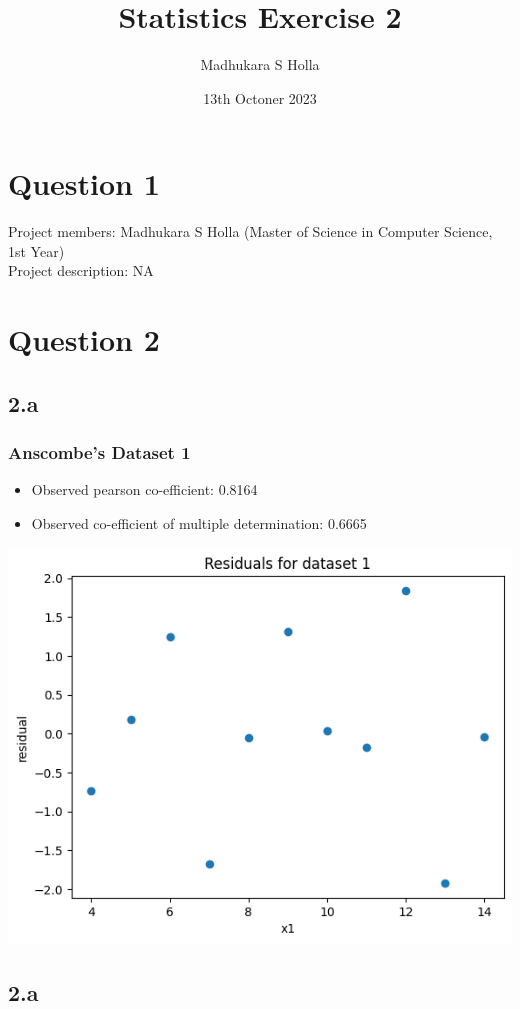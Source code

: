 \documentclass[12pt]{article}
\author{Madhukara S Holla}
\title{Statistics Exercise 2}
\date{13th Octoner 2023}
\begin{document}
\maketitle
\newpage
\section*{Question 1}
Project members: Madhukara S Holla (Master of Science in Computer Science, 1st Year)
\\
Project description: NA

\newpage
\section*{Question 2}
\subsection*{2.a}
\subsubsection*{Anscombe's Dataset 1}
\begin{itemize}
    \item Observed pearson co-efficient: 0.8164
    \item Observed co-efficient of multiple determination: 0.6665
\end{itemize}
\includegraphics*[width=\linewidth]{graph2a1}

\newpage
\subsection*{2.a}
\end{document}
